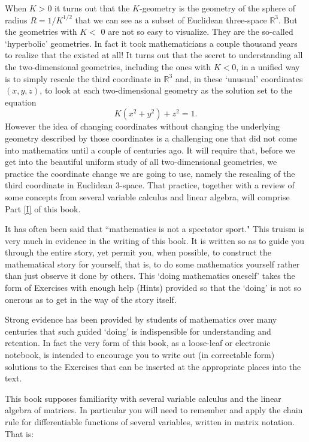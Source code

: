 \documentclass{article}%
\begin{document}
When $K>0$ it turns out that the $K$-geometry is the geometry of the sphere of
radius $R=1/K^{1/2}$ that we can see as a subset of Euclidean three-space
$\mathbb{R}^{3}$. But the geometries with $K<$ $0$ are not so easy to
visualize. They are the so-called `hyperbolic' geometries. In fact it took
mathematicians a couple thousand years to realize that the existed at all! It
turns out that the secret to understanding all the two-dimensional geometries,
including the ones with $K<0$, in a unified way is to simply rescale the third
coordinate in $\mathbb{R}^{3}$ and, in these `unusual' coordinates $\left(
x,y,z\right)  $, to look at each two-dimensional geometry as the solution set
to the equation%
\[
K\left(  x^{2}+y^{2}\right)  +z^{2}=1.
\]
However the idea of changing coordinates without changing the underlying
geometry described by those coordinates is a challenging one that did not come
into mathematics until a couple of centuries ago. It will require that, before
we get into the beautiful uniform study of all two-dimensional geometries, we
practice the coordinate change we are going to use, namely the rescaling of
the third coordinate in Euclidean $3$-space. That practice, together with a
review of some concepts from several variable calculus and linear algebra,
will comprise Part \ref{I} of this book.

It has often been said that \textquotedblleft mathematics is not a spectator
sport." This truism is very much in evidence in the writing of this book. It
is written so as to guide you through the entire story, yet permit you, when
possible, to construct the mathematical story for yourself, that is, to do
some mathematics yourself rather than just observe it done by others. This
`doing mathematics oneself' takes the form of Exercises with enough help
(Hints) provided so that the `doing' is not so onerous as to get in the way of
the story itself.

Strong evidence has been provided by students of mathematics over many
centuries that such guided `doing' is indispensible for understanding and
retention. In fact the very form of this book, as a loose-leaf or electronic
notebook, is intended to encourage you to write out (in correctable form)
solutions to the Exercises that can be inserted at the appropriate places into
the text.

This book supposes familiarity with several variable calculus and the linear
algebra of matrices. In particular you will need to remember and apply the
chain rule for differentiable functions of several variables, written in
matrix notation. That is:
\end{document}
